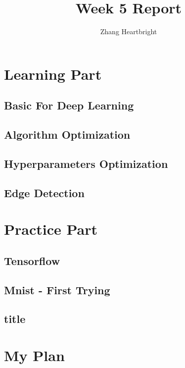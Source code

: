\documentclass{article}
\author{Zhang Heartbright}
\title{Week 5 Report}
\begin{document}
\maketitle
	\section{Learning Part}
		\subsection{Basic For Deep Learning}
		\subsection{Algorithm Optimization}
		\subsection{Hyperparameters Optimization}
		\subsection{Edge Detection}
	\section{Practice Part}
		\subsection{Tensorflow}
		\subsection{Mnist - First Trying}
		\subsection{title}
		
	\section{My Plan}
\end{document}
